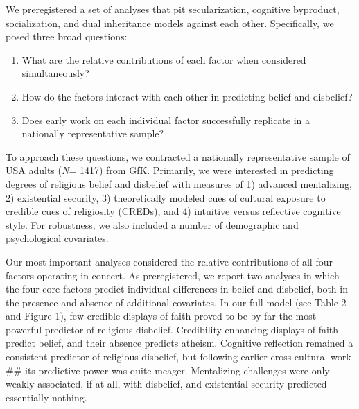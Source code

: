 \documentclass[]{article}
\providecommand{\tightlist}{%
  \setlength{\itemsep}{0pt}\setlength{\parskip}{0pt}}
\begin{document}
We preregistered a set of analyses that pit secularization, cognitive
byproduct, socialization, and dual inheritance models against each
other. Specifically, we posed three broad questions:

\begin{enumerate}
\def\labelenumi{\Roman{enumi}.}
\tightlist
\item
  What are the relative contributions of each factor when considered
  simultaneously?
\item
  How do the factors interact with each other in predicting belief and
  disbelief?
\item
  Does early work on each individual factor successfully replicate in a
  nationally representative sample?
\end{enumerate}

To approach these questions, we contracted a nationally representative
sample of USA adults (\emph{N}= 1417) from GfK. Primarily, we were
interested in predicting degrees of religious belief and disbelief with
measures of 1) advanced mentalizing, 2) existential security, 3)
theoretically modeled cues of cultural exposure to credible cues of
religiosity (CREDs), and 4) intuitive versus reflective cognitive style.
For robustness, we also included a number of demographic and
psychological covariates.

Our most important analyses considered the relative contributions of all
four factors operating in concert. As preregistered, we report two
analyses in which the four core factors predict individual differences
in belief and disbelief, both in the presence and absence of additional
covariates. In our full model (see Table 2 and Figure 1), few credible
displays of faith proved to be by far the most powerful predictor of
religious disbelief. Credibility enhancing displays of faith predict
belief, and their absence predicts atheism. Cognitive reflection
remained a consistent predictor of religious disbelief, but following
earlier cross-cultural work \#\# its predictive power was quite meager.
Mentalizing challenges were only weakly associated, if at all, with
disbelief, and existential security predicted essentially nothing.
\end{document}
